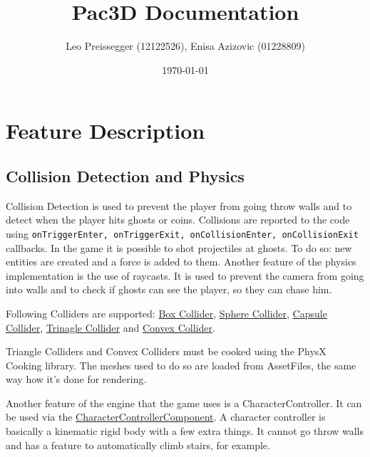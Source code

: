 \documentclass{article}
\title{Pac3D Documentation}
\author{Leo Preissegger (12122526), Enisa Azizovic (01228809)}
\date{\today}
\begin{document}
    \maketitle

    \section{Feature Description}
    \label{sec:featureDesc}

    \subsection{Collision Detection and Physics}
    \label{sec:physics}

    Collision Detection is used to prevent the player from going throw walls and to detect when the player hits ghosts or coins. Collisions are reported to the code using \verb|onTriggerEnter, onTriggerExit, onCollisionEnter, onCollisionExit| callbacks. In the game it is possible to shot projectiles at ghosts. To do so: new entities are created and a force is added to them. Another feature of the physics implementation is the use of raycasts. It is used to prevent the camera from going into walls and to check if ghosts can see the player, so they can chase him.

    Following Colliders are supported: \href{https://github.com/Liioooo/cgue23-pac3D/blob/master/docs/md/COMPONENTS_DOCS.md#boxcollidercomponent}{Box Collider}, \href{https://github.com/Liioooo/cgue23-pac3D/blob/master/docs/md/COMPONENTS_DOCS.md#boxcollidercomponent}{Sphere Collider}, \href{https://github.com/Liioooo/cgue23-pac3D/blob/master/docs/md/COMPONENTS_DOCS.md#boxcollidercomponent}{Capsule Collider}, \href{https://github.com/Liioooo/cgue23-pac3D/blob/master/docs/md/COMPONENTS_DOCS.md#boxcollidercomponent}{Trinagle Collider} and \href{https://github.com/Liioooo/cgue23-pac3D/blob/master/docs/md/COMPONENTS_DOCS.md#boxcollidercomponent}{Convex Collider}.

    Triangle Colliders and Convex Colliders must be cooked using the PhysX Cooking library. The meshes used to do so are loaded from AssetFiles, the same way how it's done for rendering.

    Another feature of the engine that the game uses is a CharacterController. It can be used via the \href{https://github.com/Liioooo/cgue23-pac3D/blob/master/docs/md/COMPONENTS_DOCS.md#charactercontrollercomponent}{CharacterControllerComponent}. A character controller is basically a kinematic rigid body with a few extra things. It cannot go throw walls and has a feature to automatically climb stairs, for example.
\end{document}
